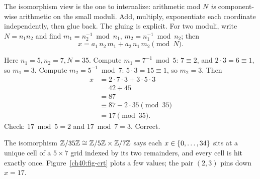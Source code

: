 The isomorphism view is the one to internalize: arithmetic mod $N$ \emph{is} component-wise
arithmetic on the small moduli. Add, multiply, exponentiate each coordinate independently, then glue
back. The gluing is explicit. For two moduli, write $N=n_1 n_2$ and find $m_1 = n_2^{-1}\bmod n_1$,
$m_2 = n_1^{-1}\bmod n_2$; then
\[
  x = a_1\, n_2\, m_1 + a_2\, n_1\, m_2 \pmod N.
\]

\begin{example}
\label{ch40:ex-crt}
Here $n_1=5,n_2=7,N=35$. Compute $m_1 = 7^{-1}\bmod 5$: $7\equiv 2$, and $2\cdot 3=6\equiv 1$, so
$m_1=3$. Compute $m_2 = 5^{-1}\bmod 7$: $5\cdot 3=15\equiv 1$, so $m_2=3$. Then
\begin{align*}
  x &= 2\cdot 7\cdot 3 + 3\cdot 5\cdot 3 \\
    &= 42 + 45 \\
    &= 87 \\
    &\equiv 87 - 2\cdot 35 \pmod{35} \\
    &= 17 \pmod{35}.
\end{align*}
Check: $17\bmod 5 = 2$ and $17\bmod 7 = 3$. Correct.
\end{example}

The isomorphism $\mathbb{Z}/35\mathbb{Z}\cong\mathbb{Z}/5\mathbb{Z}\times\mathbb{Z}/7\mathbb{Z}$ says each $x\in\{0,\dots,34\}$ sits at a unique
cell of a $5\times 7$ grid indexed by its two remainders, and every cell is hit exactly once.
Figure~\ref{ch40:fig-crt} plots a few values; the pair $(2,3)$ pins down $x=17$.

